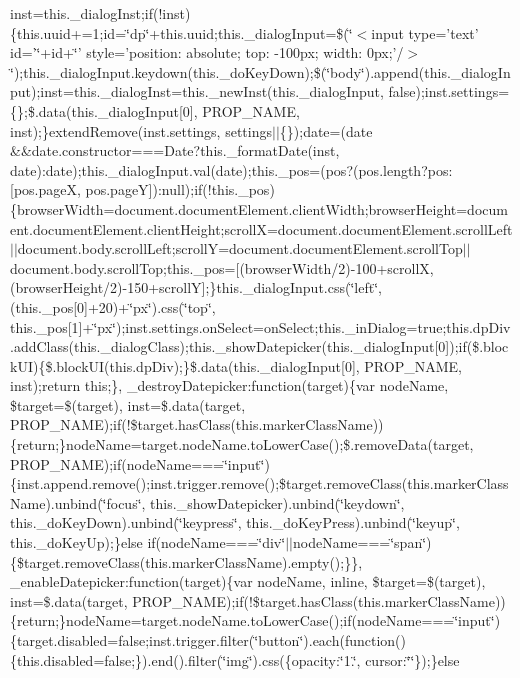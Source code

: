 {{\begin{DoxyParamCaption}
inst=this.\+\_\+dialog\+Inst;if(!inst)\{this.\+uuid+=1;id=\char`\"{}dp\char`\"{}+this.\+uuid;this.\+\_\+dialog\+Input=\$(\char`\"{}$<$input type='text' id='\char`\"{}+id+\char`\"{}' style='position\+: absolute; top\+: -\/100px; width\+: 0px;'/$>$\char`\"{});this.\+\_\+dialog\+Input.\+keydown(this.\+\_\+do\+Key\+Down);\$(\char`\"{}body\char`\"{}).\+append(this.\+\_\+dialog\+Input);inst=this.\+\_\+dialog\+Inst=this.\+\_\+new\+Inst(this.\+\_\+dialog\+Input, false);inst.\+settings=\{\};\$.\+data(this.\+\_\+dialog\+Input\mbox{[}0\mbox{]}, P\+R\+O\+P\+\_\+\+N\+A\+M\+E, inst);\}extend\+Remove(inst.\+settings, settings$\vert$$\vert$\{\});date=(date \&\&date.\+constructor===\+Date?this.\+\_\+format\+Date(inst, date)\+:date);this.\+\_\+dialog\+Input.\+val(date);this.\+\_\+pos=(pos?(pos.\+length?pos\+:\mbox{[}pos.\+page\+X, pos.\+page\+Y\mbox{]})\+:null);if(!this.\+\_\+pos)\{browser\+Width=document.\+document\+Element.\+client\+Width;browser\+Height=document.\+document\+Element.\+client\+Height;scroll\+X=document.\+document\+Element.\+scroll\+Left$\vert$$\vert$document.\+body.\+scroll\+Left;scroll\+Y=document.\+document\+Element.\+scroll\+Top$\vert$$\vert$document.\+body.\+scroll\+Top;this.\+\_\+pos=\mbox{[}(browser\+Width/2)-\/100+scroll\+X,(browser\+Height/2)-\/150+scroll\+Y\mbox{]};\}this.\+\_\+dialog\+Input.\+css(\char`\"{}left\char`\"{},(this.\+\_\+pos\mbox{[}0\mbox{]}+20)+\char`\"{}px\char`\"{}).\+css(\char`\"{}top\char`\"{}, this.\+\_\+pos\mbox{[}1\mbox{]}+\char`\"{}px\char`\"{});inst.\+settings.\+on\+Select=on\+Select;this.\+\_\+in\+Dialog=true;this.\+dp\+Div.\+add\+Class(this.\+\_\+dialog\+Class);this.\+\_\+show\+Datepicker(this.\+\_\+dialog\+Input\mbox{[}0\mbox{]});if(\$.\+block\+U\+I)\{\$.\+block\+U\+I(this.\+dp\+Div);\}\$.\+data(this.\+\_\+dialog\+Input\mbox{[}0\mbox{]}, P\+R\+O\+P\+\_\+\+N\+A\+M\+E, inst);return this;\}, \+\_\+destroy\+Datepicker\+:function(target)\{var node\+Name, \$target=\$(target), inst=\$.\+data(target, P\+R\+O\+P\+\_\+\+N\+A\+M\+E);if(!\$target.\+has\+Class(this.\+marker\+Class\+Name))\{return;\}node\+Name=target.\+node\+Name.\+to\+Lower\+Case();\$.\+remove\+Data(target, P\+R\+O\+P\+\_\+\+N\+A\+M\+E);if(node\+Name===\char`\"{}input\char`\"{})\{inst.\+append.\+remove();inst.\+trigger.\+remove();\$target.\+remove\+Class(this.\+marker\+Class\+Name).\+unbind(\char`\"{}focus\char`\"{}, this.\+\_\+show\+Datepicker).\+unbind(\char`\"{}keydown\char`\"{}, this.\+\_\+do\+Key\+Down).\+unbind(\char`\"{}keypress\char`\"{}, this.\+\_\+do\+Key\+Press).\+unbind(\char`\"{}keyup\char`\"{}, this.\+\_\+do\+Key\+Up);\}else if(node\+Name===\char`\"{}div\char`\"{}$\vert$$\vert$node\+Name===\char`\"{}span\char`\"{})\{\$target.\+remove\+Class(this.\+marker\+Class\+Name).\+empty();\}\}, \+\_\+enable\+Datepicker\+:function(target)\{var node\+Name, inline, \$target=\$(target), inst=\$.\+data(target, P\+R\+O\+P\+\_\+\+N\+A\+M\+E);if(!\$target.\+has\+Class(this.\+marker\+Class\+Name))\{return;\}node\+Name=target.\+node\+Name.\+to\+Lower\+Case();if(node\+Name===\char`\"{}input\char`\"{})\{target.\+disabled=false;inst.\+trigger.\+filter(\char`\"{}button\char`\"{}).\+each(function()\{this.\+disabled=false;\}).\+end().\+filter(\char`\"{}img\char`\"{}).\+css(\{opacity\+:\char`\"{}1.\char`\"{}, cursor\+:\char`\"{}\char`\"{}\});\}else 
\end{DoxyParamCaption}}}
